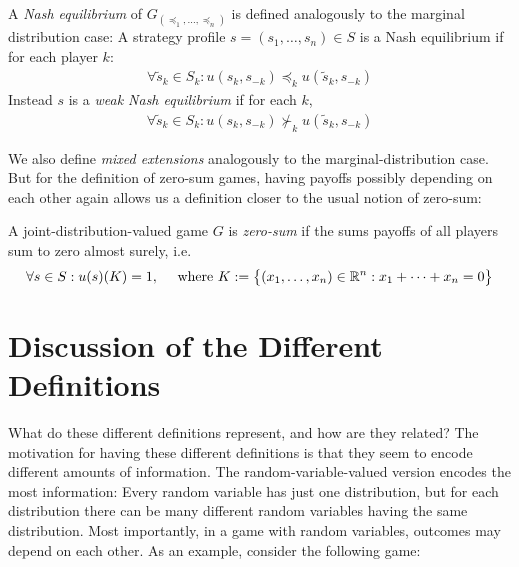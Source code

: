 \documentclass[a4paper]{scrreprt}
\begin{document}
    \begin{defn}
        A \emph{Nash equilibrium} of $G_{(\preccurlyeq_1, \dots, \preccurlyeq_n)}$ is defined analogously to the marginal distribution case:
        A strategy profile $s = (s_1, \dots, s_n) \in S$ is a Nash equilibrium if for each player $k$:
        \begin{gather*}
            \forall \tilde{s}_k \in S_k: u(s_k, s_{-k}) \preccurlyeq_k u(\tilde{s}_k, s_{-k})
        \end{gather*}
        Instead $s$ is a \emph{weak Nash equilibrium} if for each $k$,
        \begin{gather*}
            \forall \tilde{s}_k \in S_k: u(s_k, s_{-k}) \nsucc_k u(\tilde{s}_k, s_{-k})
        \end{gather*}
    \end{defn}
    We also define \emph{mixed extensions} analogously to the marginal-distribution case.
    But for the definition of zero-sum games, having payoffs possibly depending on each other again allows us a definition closer to the usual notion of zero-sum:
    \begin{defn}
        A joint-distribution-valued game $G$ is \emph{zero-sum} if the sums payoffs of all players sum to zero almost surely, i.e.
        \[
            \forall s \in S: u(s)(K) = 1, \quad \text{ where } K := \bigl\{(x_1,\dots,x_n)\in \mathbb{R}^n: x_1 + \dots + x_n = 0\bigr\}
        \]
    \end{defn}

    \section{Discussion of the Different Definitions}
    What do these different definitions represent, and how are they related?
    The motivation for having these different definitions is that they seem to encode different amounts of information.
    The random-variable-valued version encodes the most information: Every random variable has just one distribution, but for each distribution there can be many different random variables having the same distribution. Most importantly, in a game with random variables, outcomes may depend on each other. As an example, consider the following game:
    
\end{document}
